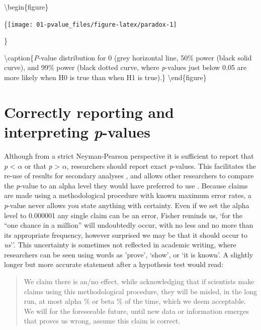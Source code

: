 \documentclass[
]{krantz}
\begin{document}
\textbackslash begin\{figure\}

\{\centering \texttt{[image: 01-pvalue\_files/figure-latex/paradox-1]}

\}

\textbackslash caption\{\emph{P}-value distribution for 0 (grey horizontal line, 50\% power (black solid curve), and 99\% power (black dotted curve, where \emph{p}-values just below 0.05 are more likely when H0 is true than when H1 is true).\}\label{fig:paradox}
\textbackslash end\{figure\}

\hypertarget{correctly-reporting-and-interpreting-p-values}{%
\section{\texorpdfstring{Correctly reporting and interpreting \emph{p}-values}{Correctly reporting and interpreting p-values}}\label{correctly-reporting-and-interpreting-p-values}}

Although from a strict Neyman-Pearson perspective it is sufficient to report that \emph{p} \textless{} \(\alpha\) or that \emph{p} \textgreater{} \(\alpha\), researchers should report exact \emph{p}-values. This facilitates the re-use of results for secondary analyses \citep{appelbaum_journal_2018}, and allows other researchers to compare the \emph{p}-value to an alpha level they would have preferred to use \citep{lehmann_testing_2005}. Because claims are made using a methodological procedure with known maximum error rates, a \emph{p}-value never allows you state anything with certainty. Even if we set the alpha level to 0.000001 any single claim can be an error, Fisher \citeyearpar{fisher_design_1935} reminds us, `for the ``one chance in a million'' will undoubtedly occur, with no less and no more than its appropriate frequency, however surprised we may be that it should occur to \emph{us}''. This uncertainty is sometimes not reflected in academic writing, where researchers can be seen using words as 'prove', `show', or `it is known'. A slightly longer but more accurate statement after a hypothesis test would read:

\begin{quote}
We claim there is an/no effect, while acknowledging that if scientists make claims using this methodological procedure, they will be misled, in the long run, at most alpha \% or beta \% of the time, which we deem acceptable. We will for the foreseeable future, until new data or information emerges that proves us wrong, assume this claim is correct.
\end{quote}
\end{document}
